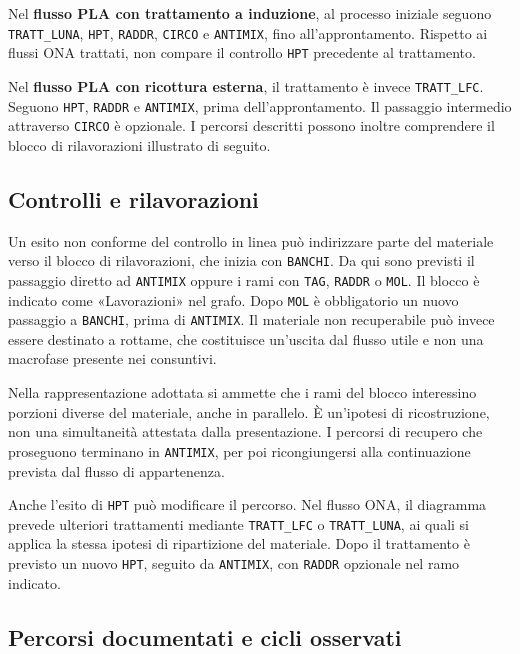 Nel \textbf{flusso PLA con trattamento a induzione}, al processo iniziale seguono \texttt{TRATT\_LUNA}, \texttt{HPT}, \texttt{RADDR}, \texttt{CIRCO} e \texttt{ANTIMIX}, fino all'approntamento. Rispetto ai flussi ONA trattati, non compare il controllo \texttt{HPT} precedente al trattamento.

Nel \textbf{flusso PLA con ricottura esterna}, il trattamento è invece \texttt{TRATT\_LFC}. Seguono \texttt{HPT}, \texttt{RADDR} e \texttt{ANTIMIX}, prima dell'approntamento. Il passaggio intermedio attraverso \texttt{CIRCO} è opzionale. I percorsi descritti possono inoltre comprendere il blocco di rilavorazioni illustrato di seguito.

\subsection{Controlli e rilavorazioni}

Un esito non conforme del controllo in linea può indirizzare parte del materiale verso il blocco di rilavorazioni, che inizia con \texttt{BANCHI}. Da qui sono previsti il passaggio diretto ad \texttt{ANTIMIX} oppure i rami con \texttt{TAG}, \texttt{RADDR} o \texttt{MOL}. Il blocco è indicato come «Lavorazioni» nel grafo. Dopo \texttt{MOL} è obbligatorio un nuovo passaggio a \texttt{BANCHI}, prima di \texttt{ANTIMIX}. Il materiale non recuperabile può invece essere destinato a rottame, che costituisce un'uscita dal flusso utile e non una macrofase presente nei consuntivi.

Nella rappresentazione adottata si ammette che i rami del blocco interessino porzioni diverse del materiale, anche in parallelo. È un'ipotesi di ricostruzione, non una simultaneità attestata dalla presentazione. I percorsi di recupero che proseguono terminano in \texttt{ANTIMIX}, per poi ricongiungersi alla continuazione prevista dal flusso di appartenenza.

Anche l'esito di \texttt{HPT} può modificare il percorso. Nel flusso ONA, il diagramma prevede ulteriori trattamenti mediante \texttt{TRATT\_LFC} o \texttt{TRATT\_LUNA}, ai quali si applica la stessa ipotesi di ripartizione del materiale. Dopo il trattamento è previsto un nuovo \texttt{HPT}, seguito da \texttt{ANTIMIX}, con \texttt{RADDR} opzionale nel ramo indicato.

\subsection{Percorsi documentati e cicli osservati}

